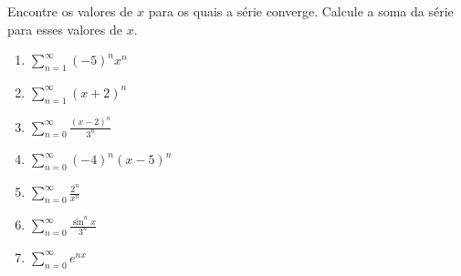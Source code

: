 \item\label{5}
Encontre os valores de $x$ para os quais a série converge. Calcule
a soma da série para esses valores de $x$.

\begin{multicols}{2}
    \begin{enumerate}
        \item $\displaystyle \sum_{n=1}^{\infty} (-5)^n x^n$
        \item $\displaystyle \sum_{n=1}^{\infty} (x+2)^n$
        \item $\displaystyle \sum_{n=0}^{\infty} \frac{(x-2)^n}{3^n}$
        \item $\displaystyle \sum_{n=0}^{\infty} (-4)^n (x-5)^n$
        \item $\displaystyle \sum_{n=0}^{\infty} \frac{2^n}{x^n}$
        \item $\displaystyle \sum_{n=0}^{\infty} \frac{\sin^n x}{3^n}$
        \item $\displaystyle \sum_{n=0}^{\infty} e^{nx}$
    \end{enumerate}
\end{multicols}
